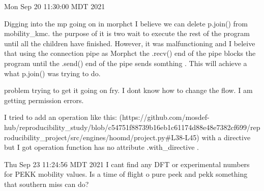 Mon Sep 20 11:30:00 MDT 2021
    
    Digging into the mp going on in morphct I believe we can delete p.join() from 
    mobility_kmc. the purpose of it is two wait to execute the rest of the program
    until all the children have finished. However, it was malfunctioning and I beleive
    that using the connection pipe as Morphct the .recv() end of the pipe blocks the
    program until the .send() end of the pipe sends somthing . This will achieve 
    a what p.join() was trying to do. 

    problem trying to get it going on fry. I dont know how to change the flow. 
    I am getting permission errors. 

    I tried to add an operation like this: 
    (https://github.com/mosdef-hub/reproducibility_study/blob/c54751f88739b16eb1c61174d88e48e7382cf699/reproducibility_project/src/engines/hoomd/project.py#L38-L45)
    with a directive but I got operation function has no
    attribute .with_directive .
    
Thu Sep 23 11:24:56 MDT 2021
    I cant find any DFT or experimental numbers for PEKK mobility values. Is a time of flight o
    pure peek and pekk something that southern miss can do?
